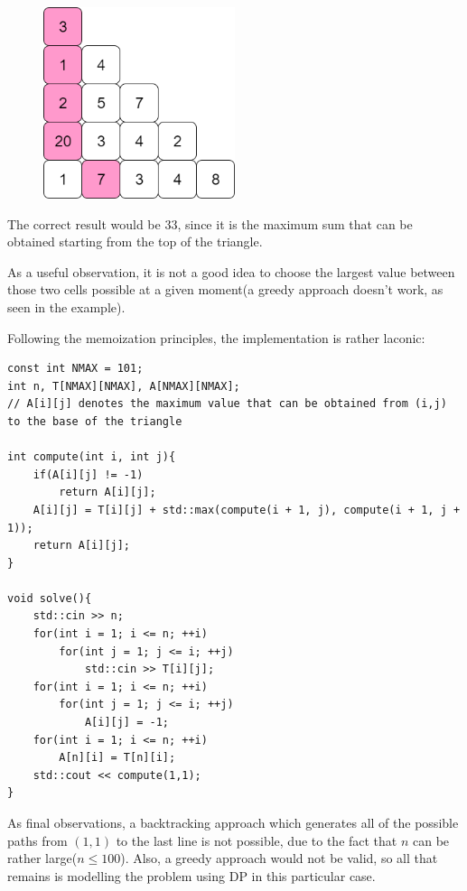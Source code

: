 \documentclass[letterpaper]{article}
\begin{document}
\begin{figure} [h!]
\centering
\includegraphics[width=0.50\textwidth]{pngOfDiagrams/IOI1994.png}
\end{figure}

The correct result would be 33, since it is the maximum sum that can be obtained starting from the top of the triangle.

As a useful observation, it is not a good idea to choose the largest value between those two cells possible at a given moment(a greedy approach doesn't work, as seen in the example).

Following the memoization principles, the implementation is rather laconic:

\begin{lstlisting}
const int NMAX = 101;
int n, T[NMAX][NMAX], A[NMAX][NMAX];
// A[i][j] denotes the maximum value that can be obtained from (i,j) to the base of the triangle

int compute(int i, int j){
    if(A[i][j] != -1)
        return A[i][j];
    A[i][j] = T[i][j] + std::max(compute(i + 1, j), compute(i + 1, j + 1));
    return A[i][j];
}

void solve(){
    std::cin >> n;
    for(int i = 1; i <= n; ++i)
        for(int j = 1; j <= i; ++j)
            std::cin >> T[i][j];
    for(int i = 1; i <= n; ++i)
        for(int j = 1; j <= i; ++j)
            A[i][j] = -1;
    for(int i = 1; i <= n; ++i)
        A[n][i] = T[n][i];
    std::cout << compute(1,1);
}
\end{lstlisting}

As final observations, a backtracking approach which generates all of the possible paths from $(1,1)$ to the last line is not possible, due to the fact that $n$ can be rather large($n \leq 100$). Also, a greedy approach would not be valid, so all that remains is modelling the problem using DP in this particular case.
\end{document}
